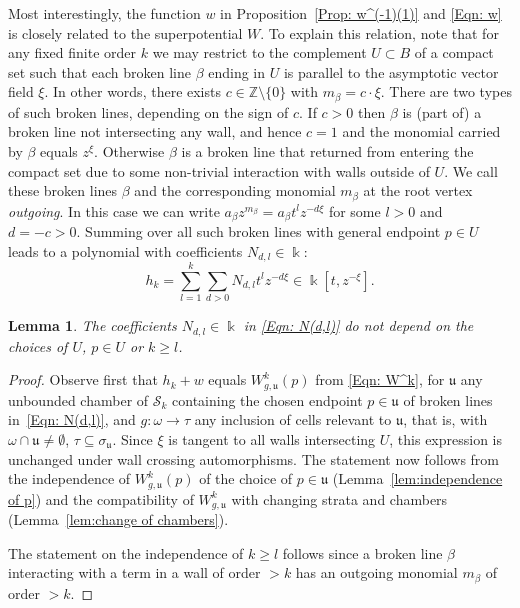 \documentclass[11pt,letter]{amsart}
\newtheorem{lemma}[theorem]{Lemma}
\theoremstyle{definition}
\theoremstyle{remark}
\numberwithin{equation}{section}
\numberwithin{figure}{section}
\newcommand{\ZZ} {\mathbb{Z}}
\newcommand {\fou}  {\mathfrak{u}}
\newcommand {\kk} {\Bbbk}
\newcommand {\scrS}  {\mathscr{S}}
\begin{document}
Most interestingly, the function $w$ in Proposition~\ref{Prop: w^(-1)(1)} and
\eqref{Eqn: w} is closely related to the superpotential $W$. To explain this
relation, note that for any fixed finite order $k$ we may restrict to the
complement $U\subset B$ of a compact set such that each broken line $\beta$
ending in $U$ is parallel to the asymptotic vector field $\xi$. In other words,
there exists $c\in\ZZ\setminus\{0\}$ with $m_\beta= c\cdot\xi$. There are two
types of such broken lines, depending on the sign of $c$. If $c>0$ then $\beta$
is (part of) a broken line not intersecting any wall, and hence $c=1$ and the
monomial carried by $\beta$ equals $z^\xi$. Otherwise $\beta$ is a broken line
that returned from entering the compact set due to some non-trivial interaction
with walls outside of $U$. We call these broken lines $\beta$ and the
corresponding monomial $m_\beta$ at the root vertex \emph{outgoing}. In this
case we can write $a_\beta z^{m_\beta} = a_\beta t^l z^{-d\xi}$ for some $l>0$
and $d=-c>0$. Summing over all such broken lines with general endpoint $p\in U$
leads to a polynomial with coefficients $N_{d,l}\in\kk$:
\begin{equation}
\label{Eqn: N(d,l)}
h_k=\sum_{l=1}^k\sum_{d>0} N_{d,l}t^l z^{-d\xi}\in \kk[t,z^{-\xi}].
\end{equation}

\begin{lemma}
The coefficients $N_{d,l}\in\kk$ in \eqref{Eqn: N(d,l)} do not depend on the
choices of $U$, $p\in U$ or $k\ge l$.
\end{lemma}

\begin{proof}
Observe first that $h_k+w$ equals $W^k_{g,\fou}(p)$ from \eqref{Eqn: W^k}, for
$\fou$ any unbounded chamber of $\scrS_k$ containing the chosen endpoint
$p\in\fou$ of broken lines in~\eqref{Eqn: N(d,l)}, and $g:\omega\to\tau$ any
inclusion of cells relevant to $\fou$, that is, with $\omega\cap\fou\neq
\emptyset$, $\tau\subseteq\sigma_\fou$. Since $\xi$ is tangent to all walls
intersecting $U$, this expression is unchanged under wall crossing
automorphisms. The statement now follows from the independence of
$W^k_{g,\fou}(p)$ of the choice of $p\in \fou$ (Lemma~\ref{lem:independence of
p}) and the compatibility of $W^k_{g,\fou}$ with changing strata and chambers
(Lemma~\ref{lem:change of chambers}).

The statement on the independence of $k\ge l$ follows since a broken line
$\beta$ interacting with a term in a wall of order $>k$ has an outgoing monomial
$m_\beta$ of order $>k$.
\end{proof}
\end{document}
